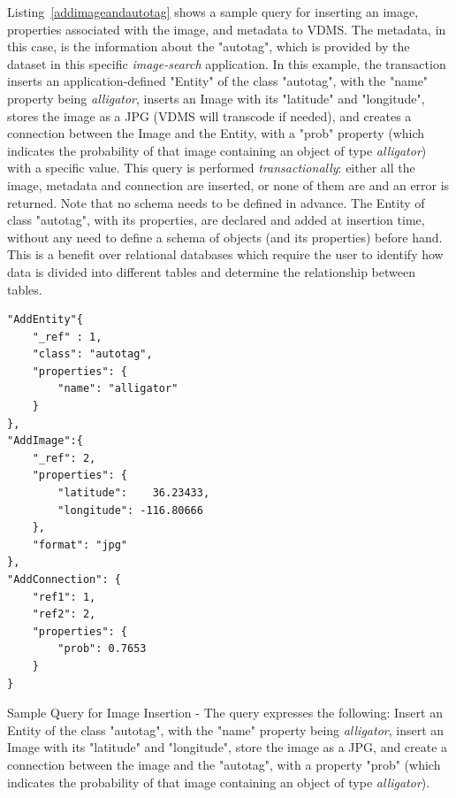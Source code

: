Listing~\ref{addimageandautotag} shows a sample query for inserting
an image, properties associated with the image, and metadata to VDMS.
The metadata, in this case, is the information about the "autotag",
which is provided by the dataset in this specific
\textit{image-search} application.
In this example, the transaction inserts an application-defined "Entity" of
the class "autotag", with the "name" property being \textit{alligator},
inserts an Image with its "latitude" and "longitude",
stores the image as a JPG (VDMS will transcode if needed),
and creates a connection between the Image and the Entity, with a "prob"
property (which indicates the probability of that image
containing an object of type  \textit{alligator}) with a specific value.
This query is performed \textit{transactionally}: either all the image, metadata
and connection are inserted, or none of them are and an error is returned.
Note that no schema needs to be defined in advance.
The Entity of class "autotag", with its properties, are declared and added
at insertion time, without any need to define a schema of objects
(and its properties) before hand. This is a benefit over relational
databases which require the user to identify how data is divided into
different tables and determine the relationship between tables.

\begin{listing}[ht!]
\begin{verbatim}
"AddEntity"{
    "_ref" : 1,
    "class": "autotag",
    "properties": {
        "name": "alligator"
    }
},
"AddImage":{
    "_ref": 2,
    "properties": {
        "latitude":    36.23433,
        "longitude": -116.80666
    },
    "format": "jpg"
},
"AddConnection": {
    "ref1": 1,
    "ref2": 2,
    "properties": {
        "prob": 0.7653
    }
}

\end{verbatim}
\caption{Sample Query for Image Insertion -
The query expresses the following:
Insert an Entity of the class "autotag", with the "name" property being
\textit{alligator}, insert an Image with its "latitude" and "longitude",
store the image as a JPG, and create a connection between
the image and the "autotag", with a property "prob"
(which indicates the probability of that image
containing an object of type \textit{alligator}).}
\label{addimageandautotag}
\end{listing}


